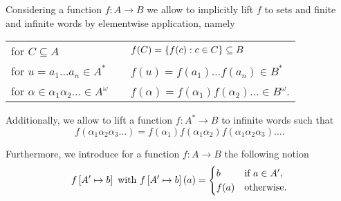 Considering a function $f:A\rightarrow B$ we allow to implicitly lift $f$ to
sets and finite and infinite words by elementwise application, namely
\begin{center}
  \begin{tabular}{lp{0.5cm}l}
    for $C\subseteq A$ & & $f(C) = \left\{f(c) : c\in C\right\}\subseteq B$ \\
    for $u = a_{1}\dots a_{n}\in A^{*}$ & & $f(u) = f(a_{1})
    \dots f(a_{n}) \in B^{*}$ \\
  for $\alpha\in\alpha_{1}\alpha_{2}\dots\in A^{\omega}$
    & & $f(\alpha) = f(\alpha_{1})f(\alpha_{2})\dots\in B^{\omega}$.\\
  \end{tabular}
\end{center}
Additionally, we allow to lift a function $f:A^{*}\rightarrow B$ to infinite
words such that
\begin{equation*}
  f(\alpha_{1}\alpha_{2}\alpha_{3}\dots) = f(\alpha_{1})f(
    \alpha_{1}\alpha_{2})f(\alpha_{1}\alpha_{2}\alpha_{3})\dots.
\end{equation*}

Furthermore, we introduce for a function $f:A\rightarrow B$ the following
notion
\begin{equation*}
  f\left[A'\mapsto b\right]\text{ with }f\left[A'\mapsto b\right](a) = 
  \begin{cases}
    b&\text{if }a\in A',\\
    f(a)&\text{otherwise}.
  \end{cases}
\end{equation*}
